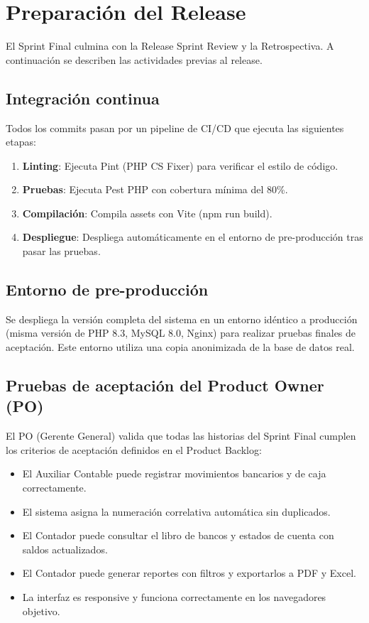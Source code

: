 \documentclass[stu]{apa7}
\begin{document}
\section{Preparación del Release}

El Sprint Final culmina con la Release Sprint Review y la Retrospectiva. A continuación se describen las actividades previas al release.

\subsection{Integración continua}

Todos los commits pasan por un pipeline de CI/CD que ejecuta las siguientes etapas:

\begin{enumerate}
    \item \textbf{Linting}: Ejecuta Pint (PHP CS Fixer) para verificar el estilo de código.
    \item \textbf{Pruebas}: Ejecuta Pest PHP con cobertura mínima del 80\%.
    \item \textbf{Compilación}: Compila assets con Vite (npm run build).
    \item \textbf{Despliegue}: Despliega automáticamente en el entorno de pre-producción tras pasar las pruebas.
\end{enumerate}

\subsection{Entorno de pre-producción}

Se despliega la versión completa del sistema en un entorno idéntico a producción (misma versión de PHP 8.3, MySQL 8.0, Nginx) para realizar pruebas finales de aceptación. Este entorno utiliza una copia anonimizada de la base de datos real.

\subsection{Pruebas de aceptación del Product Owner (PO)}

El PO (Gerente General) valida que todas las historias del Sprint Final cumplen los criterios de aceptación definidos en el Product Backlog:

\begin{itemize}
    \item El Auxiliar Contable puede registrar movimientos bancarios y de caja correctamente.
    \item El sistema asigna la numeración correlativa automática sin duplicados.
    \item El Contador puede consultar el libro de bancos y estados de cuenta con saldos actualizados.
    \item El Contador puede generar reportes con filtros y exportarlos a PDF y Excel.
    \item La interfaz es responsive y funciona correctamente en los navegadores objetivo.
\end{itemize}
\end{document}
